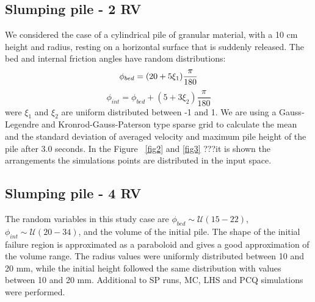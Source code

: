 \documentclass{article}
\begin{document}
\subsection{Slumping pile - 2 RV}
We considered the case of a cylindrical pile of granular material,
with a 10 cm height and radius, resting on a horizontal surface that
is suddenly released. The bed and internal friction angles have random
distributions:
\begin{equation} 
\phi_{bed} = (20 + 5\xi_1)\frac{\pi}{180} \\
\end{equation} 
\begin{equation} \nonumber
\phi_{int} = \phi_{bed} + (5 + 3\xi_2)\frac{\pi}{180}
\end{equation} 
were $\xi_1$ and $\xi_2$ are uniform distributed between -1 and 1.
We are using a Gauss-Legendre and Kronrod-Gauss-Paterson type 
sparse grid to calculate the mean and the standard deviation of averaged velocity
and maximum pile height of the pile after 3.0 seconds. In the Figure ~\ref{fig2} 
and \ref{fig3} ???it is shown the arrangements the simulations points are distributed 
in the input space. 

\subsection{Slumping pile - 4 RV}
The random variables in this study case are $\phi_{bed} \sim\mathcal{U}(15-22)$,
$\phi_{int} \sim\mathcal{U}(20-34)$, and the volume of the initial pile. The shape 
of the initial failure region is approximated as a paraboloid and gives a good
approximation of the volume range. The radius values were uniformly distributed 
between 10 and 20 mm, while the initial height followed the same distribution with values 
between 10 and 20 mm. Additional to SP runs, MC, LHS and PCQ simulations were 
performed.
\end{document}
